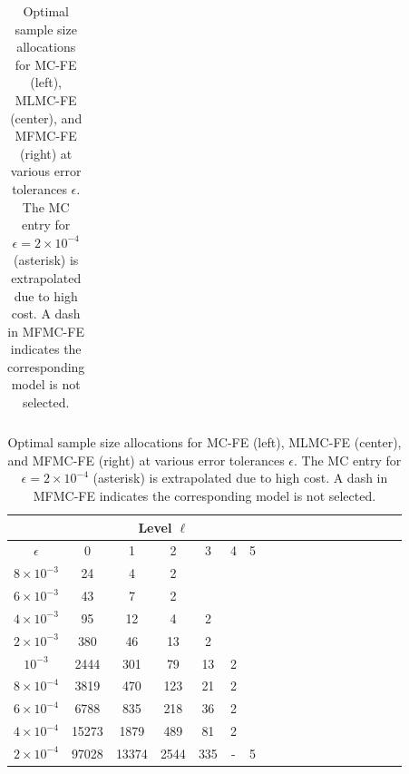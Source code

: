 \begin{table}[ht]
{\begin{tabular}{c|c|c|c|c|c|c|c|c|c|c|c|c|}
			\hline
	\end{tabular}
 \qquad
		\begin{tabular}{c|c|c|c|c|c|c|c|c|c|c|c|c|c|c|c|c|c|}
	    \cline{2-7}	
		&\multicolumn{6}{|c|}{ Level $\ell$}\\
			\hline
			\multicolumn{1}{|c|}{$\epsilon$}&0&1&2&3&4&5\\
			\hline
			\multicolumn{1}{|c|}{$8\times 10^{-3} $}&24&4&2&&&\\
			\multicolumn{1}{|c|}{$6\times 10^{-3} $}&43&7&2&&&\\
			\multicolumn{1}{|c|}{$4\times 10^{-3} $}&95&12&4&2&&\\
			\multicolumn{1}{|c|}{$2\times 10^{-3} $}&380&46&13&2&&\\
			\multicolumn{1}{|c|}{$10^{-3} $}&2444&301&79&13&2&\\
			\multicolumn{1}{|c|}{$8\times 10^{-4} $}&3819&470&123&21&2&\\
                \multicolumn{1}{|c|}{$6\times 10^{-4} $}&6788&835&218&36&2&\\
			\multicolumn{1}{|c|}{$4\times 10^{-4} $}&15273&1879&489&81&2&\\
                \multicolumn{1}{|c|}{$2\times 10^{-4} $}&97028&13374&2544&335&-&5\\
			\hline
	\end{tabular}
 
 }
	\caption{Optimal sample size allocations for MC-FE (left), MLMC-FE (center), and MFMC-FE (right) at various error tolerances $\epsilon$. The MC entry for $\epsilon = 2 \times 10^{-4}$ (asterisk) is extrapolated due to high cost. A dash in MFMC-FE indicates the corresponding model is not selected.}    
	\label{Tab:SampleSize}
\end{table}
%










